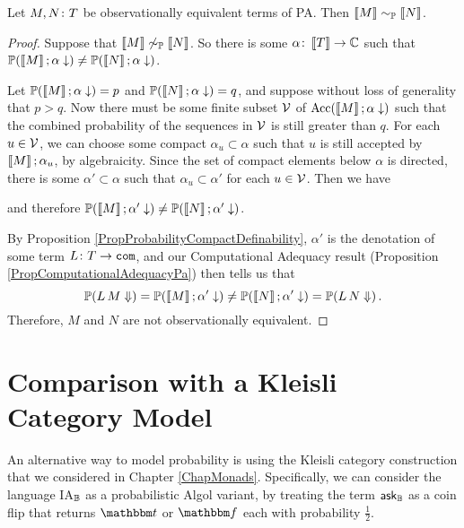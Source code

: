 \documentclass{report}[11pt]
\begin{document}
\begin{theorem}
  Let $M,N \colon T$ be observationally equivalent terms of PA.  
  Then $\left\llbracket M\right\rrbracket \sim_{\mathbb{P}} \left\llbracket N\right\rrbracket$.
  \label{TheFullAbstractionPa}
\end{theorem}
\begin{proof}
  Suppose that $\left\llbracket M\right\rrbracket \not\sim_{\mathbb{P}} \left\llbracket N\right\rrbracket$.
  So there is some $\alpha \colon \left\llbracket T\right\rrbracket \to \mathbb{C}$ such that $\mathbb{P}(\left\llbracket M\right\rrbracket;\alpha\downarrow) \ne \mathbb{P}(\left\llbracket N\right\rrbracket;\alpha\downarrow)$.

  Let $\mathbb{P}(\left\llbracket M\right\rrbracket;\alpha\downarrow) = p$ and $\mathbb{P}(\left\llbracket N\right\rrbracket;\alpha\downarrow) = q$, and suppose without loss of generality that $p>q$.
  Now there must be some finite subset ${\mathcal{V}}$ of $\operatorname{Acc}(\left\llbracket M\right\rrbracket;\alpha\downarrow)$ such that the combined probability of the sequences in ${\mathcal{V}}$ is still greater than $q$.  
  For each $u\in {\mathcal{V}}$, we can choose some compact $\alpha_u\subset \alpha$ such that $u$ is still accepted by $\left\llbracket M\right\rrbracket;\alpha_u$, by algebraicity.
  Since the set of compact elements below $\alpha$ is directed, there is some $\alpha'\subset \alpha$ such that $\alpha_u\subset \alpha'$ for each $u\in {\mathcal{V}}$.  
  Then we have
  and therefore $\mathbb{P}(\left\llbracket M\right\rrbracket;\alpha'\downarrow) \ne \mathbb{P}(\left\llbracket N\right\rrbracket;\alpha'\downarrow)$.

  By Proposition \ref{PropProbabilityCompactDefinability}, $\alpha'$ is the denotation of some term $L\colon T \to {\mathtt{com}}$, and our Computational Adequacy result (Proposition \ref{PropComputationalAdequacyPa}) then tells us that 
  \[
    \mathbb{P}(L\,M\Downarrow)=\mathbb{P}(\left\llbracket M\right\rrbracket;\alpha'\downarrow)\ne\mathbb{P}(\left\llbracket N\right\rrbracket;\alpha'\downarrow) = \mathbb{P}(L\,N\Downarrow)\,.
    \]
  Therefore, $M$ and $N$ are not observationally equivalent.
\end{proof}

\section{Comparison with a Kleisli Category Model}

An alternative way to model probability is using the Kleisli category construction that we considered in Chapter \ref{ChapMonads}.  
Specifically, we can consider the language IA${}_{\mathbb{B}}$ as a probabilistic Algol variant, by treating the term $\operatorname{{\mathsf{ask}}}_{\mathbb{B}}$ as a coin flip that returns $\true$ or $\false$ each with probability $\frac12$.
\end{document}
